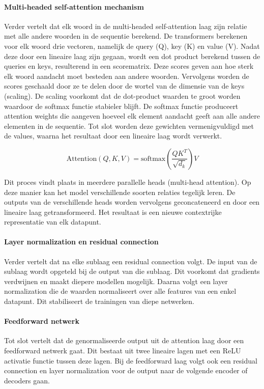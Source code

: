 \paragraph{Multi-headed self-attention mechanism}
Verder vertelt \textcite{ChittyVenkata2023} dat elk woord in de multi-headed self-attention laag zijn relatie met alle andere woorden in de sequentie berekend. De transformers berekenen voor elk woord drie vectoren, namelijk de query (Q), key (K) en value (V). Nadat deze door een lineaire laag zijn gegaan, wordt een dot product berekend tussen de queries en keys, resulterend in een scorematrix. Deze scores geven aan hoe sterk elk woord aandacht moet besteden aan andere woorden. Vervolgens worden de scores geschaald door ze te delen door de wortel van de dimensie van de keys (scaling). De scaling voorkomt dat de dot-product waarden te groot worden waardoor de softmax functie stabieler blijft. De softmax functie produceert attention weights die aangeven hoeveel elk element aandacht geeft aan alle andere elementen in de sequentie. Tot slot worden deze gewichten vermenigvuldigd met de values, waarna het resultaat door een lineaire laag wordt verwerkt.

\[
\text{Attention}(Q, K, V) = \text{softmax}\left(\frac{QK^T}{\sqrt{d_k}}\right)V
\]

Dit proces vindt plaats in meerdere parallelle heads (multi-head attention). Op deze manier kan het model verschillende soorten relaties tegelijk leren. De outputs van de verschillende heads worden vervolgens geconcateneerd en door een lineaire laag getransformeerd. Het resultaat is een nieuwe contextrijke representatie van elk datapunt.

\paragraph{Layer normalization en residual connection}
Verder vertelt \textcite{Lin2022} dat na elke sublaag een residual connection volgt. De input van de sublaag wordt opgeteld bij de output van die sublaag. Dit voorkomt dat gradients verdwijnen en maakt diepere modellen mogelijk. Daarna volgt een layer normalization die de waarden normaliseert over alle features van een enkel datapunt. Dit stabiliseert de trainingen van diepe netwerken.

\paragraph{Feedforward netwerk}
Tot slot vertelt \textcite{Tay2020} dat de genormaliseerde output uit de attention laag door een feedforward netwerk gaat. Dit bestaat uit twee lineaire lagen met een ReLU activatie functie tussen deze lagen. Bij de feedforward laag volgt ook een residual connection en layer normalization voor de output naar de volgende encoder of decoders gaan.

